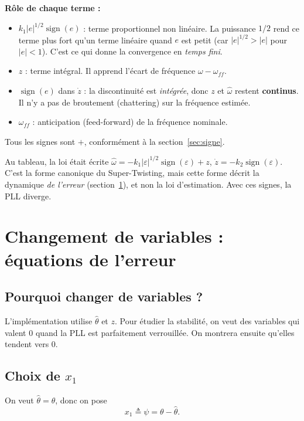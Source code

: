 \documentclass[11pt,a4paper]{article}
\numberwithin{equation}{section}
\theoremstyle{plain}
\theoremstyle{definition}
\theoremstyle{remark}
\newcommand{\sign}{\operatorname{sign}}
\newcommand{\hth}{\hat{\theta}}
\newcommand{\hw}{\hat{\omega}}
\newcommand{\wff}{\omega_{ff}}
\begin{document}
\textbf{Rôle de chaque terme :}
\begin{itemize}
  \item $k_1|e|^{1/2}\sign(e)$ : terme \og proportionnel\fg{} non linéaire. La puissance $1/2$ rend ce
        terme plus fort qu'un terme linéaire quand $e$ est petit (car $|e|^{1/2}>|e|$ pour $|e|<1$).
        C'est ce qui donne la convergence en \emph{temps fini}.
  \item $z$ : terme \og intégral\fg. Il apprend l'écart de fréquence $\omega-\wff$.
  \item $\sign(e)$ dans $\dot z$ : la discontinuité est \emph{intégrée}, donc $z$ et $\hw$ restent
        \textbf{continus}. Il n'y a pas de broutement (chattering) sur la fréquence estimée.
  \item $\wff$ : anticipation (feed-forward) de la fréquence nominale.
\end{itemize}
Tous les signes sont \og $+$\fg, conformément à la section~\ref{sec:signe}.

\begin{attention}
Au tableau, la loi était écrite
$\hw = -k_1|\varepsilon|^{1/2}\sign(\varepsilon)+z$, $\dot z=-k_2\sign(\varepsilon)$.
C'est la forme canonique du Super-Twisting, mais cette forme décrit la dynamique \emph{de l'erreur}
(section~\ref{sec:chgt}), et non la loi d'estimation. Avec ces signes, la PLL diverge.
\end{attention}

\section{Changement de variables : équations de l'erreur}\label{sec:chgt}

\subsection{Pourquoi changer de variables ?}
\begin{idee}
L'implémentation utilise $\hth$ et $z$. Pour étudier la stabilité, on veut des variables qui valent
$0$ quand la PLL est parfaitement verrouillée. On montrera ensuite qu'elles tendent vers $0$.
\end{idee}

\subsection{Choix de $x_1$}
On veut $\hth=\theta$, donc on pose
\begin{equation}
\boxed{x_1 \triangleq \psi = \theta-\hth .}
\end{equation}
\end{document}
